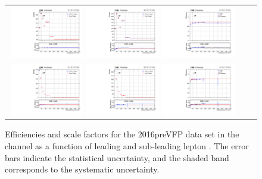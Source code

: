 {\begin{figure}[h]
  \begin{center}
    \begin{tabular}{ccc}
      \includegraphics[width=0.32\textwidth]{fig_2016preVFP_TrigSF/g_lepApt_mumu_MC.pdf}
      \includegraphics[width=0.32\textwidth]{fig_2016preVFP_TrigSF/g_lepApt_mumu_data.pdf}
      \includegraphics[width=0.32\textwidth]{fig_2016preVFP_TrigSF/g_mumu_lepApt_FullSystUncBand.pdf}\\
      \includegraphics[width=0.32\textwidth]{fig_2016preVFP_TrigSF/g_lepBpt_mumu_MC.pdf}
      \includegraphics[width=0.32\textwidth]{fig_2016preVFP_TrigSF/g_lepBpt_mumu_data.pdf}
      \includegraphics[width=0.32\textwidth]{fig_2016preVFP_TrigSF/g_mumu_lepBpt_FullSystUncBand.pdf}\\
    \end{tabular}
    \caption{Efficiencies and scale factors for the 2016preVFP data set in the \mumu channel as a function of leading and sub-leading lepton \pT.
            The error bars indicate the statistical uncertainty, and the shaded band corresponds to the systematic uncertainty.
            }
    \label{TrigSF_2016preVFP_3}
  \end{center}
\end{figure}

}
